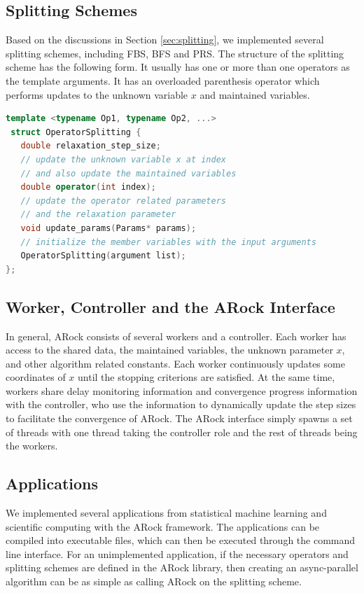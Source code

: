 \newpage
\subsection{Splitting Schemes}
Based on the discussions in Section \ref{sec:splitting}, we implemented several splitting schemes, including FBS, BFS and PRS. The structure of the splitting scheme has the following form. It usually has one or more than one operators as the template arguments. It has an overloaded parenthesis operator which performs updates to the unknown variable $x$ and maintained variables. 
 \begin{lstlisting}[language=c++]
 template <typename Op1, typename Op2, ...>
 struct OperatorSplitting {
   double relaxation_step_size;
   // update the unknown variable x at index
   // and also update the maintained variables   
   double operator(int index);
   // update the operator related parameters
   // and the relaxation parameter   
   void update_params(Params* params);
   // initialize the member variables with the input arguments
   OperatorSplitting(argument list);
};
\end{lstlisting}


\subsection{Worker, Controller and the ARock Interface}
In general, ARock consists of several workers and a controller. Each worker has access to the shared data, the maintained variables, the unknown parameter $x$, and other algorithm related constants. Each worker continuously updates some coordinates of $x$ until the stopping criterions are satisfied. At the same time, workers share delay monitoring information and convergence progress information with the controller, who use the information to dynamically update the step sizes to facilitate the convergence of ARock. The ARock interface simply spawns a set of threads with one thread taking the controller role and the rest of threads being the workers. 

\subsection{Applications}
We implemented several applications from statistical machine learning and scientific computing with the ARock framework. The applications can be compiled into executable files, which can then be executed through the command line interface. For an unimplemented application, if the necessary operators and splitting schemes are defined in the ARock library, then creating an async-parallel algorithm can be as simple as calling ARock on the splitting scheme.


